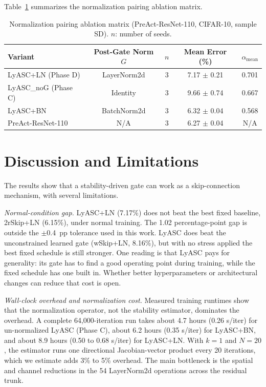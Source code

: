 \documentclass[conference,10pt]{IEEEtran}
\begin{document}
Table~\ref{tab:normpairing} summarizes the normalization pairing ablation matrix.

\begin{table}[t]
\centering
\caption{Normalization pairing ablation matrix (PreAct-ResNet-110, CIFAR-10, sample SD). $n$: number of seeds.}
\label{tab:normpairing}
\begin{tabular}{lcccc}
\toprule
Variant & Post-Gate Norm $G$ & $n$ & Mean Error (\%) & $\alpha_{\text{mean}}$ \\
\midrule
LyASC+LN (Phase D)   & LayerNorm2d & 3 & 7.17 $\pm$ 0.21 & 0.701 \\
LyASC\_noG (Phase C) & Identity    & 3 & 9.66 $\pm$ 0.74 & 0.667 \\
LyASC+BN             & BatchNorm2d & 3 & 6.32 $\pm$ 0.04 & 0.568 \\
PreAct-ResNet-110    & N/A         & 3 & 6.27 $\pm$ 0.04 & N/A   \\
\bottomrule
\end{tabular}
\end{table}


\section{Discussion and Limitations}

The results show that a stability-driven gate can work as a
skip-connection mechanism, with several limitations.

\textit{Normal-condition gap.}
LyASC+LN (7.17\%) does not beat the best fixed baseline, 2rSkip+LN
(6.15\%), under normal training. The 1.02 percentage-point gap is
outside the $\pm$0.4~pp tolerance used in this work. LyASC does beat the
unconstrained learned gate (wSkip+LN, 8.16\%), but with no stress
applied the best fixed schedule is still stronger. One reading is that
LyASC pays for generality: its gate has to find a good operating point
during training, while the fixed schedule has one built in. Whether
better hyperparameters or architectural changes can reduce that cost is
open.

\textit{Wall-clock overhead and normalization cost.}
Measured training runtimes show that the normalization operator, not the
stability estimator, dominates the overhead. A complete 64,000-iteration run takes
about 4.7 hours (0.26 s/iter) for un-normalized LyASC (Phase C),
about 6.2 hours (0.35 s/iter) for LyASC+BN, and about 8.9 hours
(0.50 to 0.68 s/iter) for LyASC+LN. With $k=1$ and $N=20$, the estimator
runs one directional Jacobian-vector product every 20 iterations, which we
estimate adds 3\% to 5\% overhead. The main bottleneck is the spatial and
channel reductions in the 54 LayerNorm2d operations across the residual
trunk.
\end{document}
